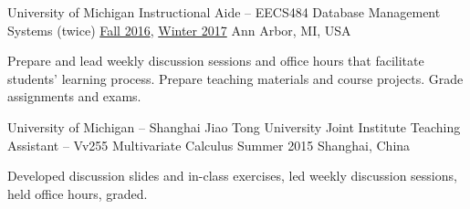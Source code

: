 \begin{cventries}

\cventry
  {University of Michigan} %
  {Instructional Aide – EECS484 Database Management Systems (twice)} %
  {\href{http://web.eecs.umich.edu/~aprakash/eecs484/index.html}{Fall 2016}, \href{http://web.eecs.umich.edu/~mozafari/eecs484/}{Winter 2017}} %
  {Ann Arbor, MI, USA} %
  {
    \begin{cvitems} %
      \item {Prepare and lead weekly discussion sessions and office hours that facilitate students' learning process. Prepare teaching materials and course projects. Grade assignments and exams.}
    \end{cvitems}
  }

\cventry
  {University of Michigan – Shanghai Jiao Tong University Joint Institute} %
  {Teaching Assistant – Vv255 Multivariate Calculus} %
  {Summer 2015} %
  {Shanghai, China} %
  {
    \begin{cvitems} %
      \item {Developed discussion slides and in-class exercises, led weekly discussion sessions, held office hours, graded.}
    \end{cvitems}
  }

\end{cventries}